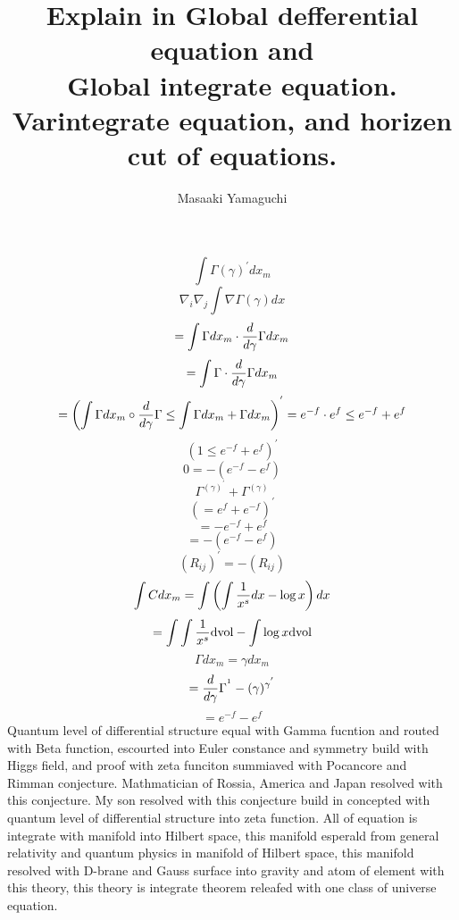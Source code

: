 \documentclass{jsarticle}
\begin{document}
  $$ \int \Gamma(\gamma)^{'}dx_m $$
  $$ \nabla_i \nabla_j \int \nabla \Gamma(\gamma)dx $$
  $$ = \int \Gamma dx_m \cdot {d \over d \gamma}\Gamma dx_m $$
  $$ = \int \Gamma \cdot {d \over d \gamma}\Gamma dx_m $$
  $$ = \left(\int \Gamma dx_m \circ {d \over d\gamma}\Gamma \le
  \int \Gamma dx_m + \Gamma dx_m \right)^{'} 
  = e^{-f} \cdot e^{f} \le e^{-f} + e^{f} $$
  $$ \left(1 \le e^{-f} + e^{f}\right)^{'} $$
  $$ 0 = -(e^{-f} - e^{f}) $$
  $$ \Gamma^{(\gamma)^{'}} + \Gamma^{(\gamma)} $$
  $$ (= e^f + e^{-f})^{'} $$
  $$ = - e^{-f} + e^{f} $$
  $$ = - (e^{-f} - e^f) $$
  $$ (R_{ij})^{'} = - (R_{ij}) $$
  $$ \int C dx_m = \int\left(\int{1 \over x^s}dx - \log x \right)dx $$
  $$ = \int \int{1 \over x^s}\mathrm{dvol} - \int \log x \mathrm{dvol} $$
  $$ \Gamma dx_m = \gamma dx_m $$
  $$ = {d \over d \gamma}\Gamma^{^1} - (\gamma)^{\gamma^{'}} $$
  $$ = e^{-f} - e^{f} $$
  Quantum level of differential structure equal with Gamma fucntion and
  routed with Beta function, escourted into Euler constance and symmetry 
  build with Higgs field, and proof with zeta funciton summiaved with 
  Pocancore and Rimman conjecture.
  Mathmatician of Rossia, America and Japan resolved with this conjecture.
  My son resolved with this conjecture build in concepted with quantum
  level of differential structure into zeta function.
  All of equation is integrate with manifold into Hilbert space,
  this manifold esperald from general relativity and quantum physics
  in manifold of Hilbert space, this manifold resolved with D-brane
  and Gauss surface into gravity and atom of element with this theory,
  this theory is integrate theorem releafed with one class of universe 
  equation.

\newpage
\title{Explain in Global defferential equation and \\
Global integrate equation. \\
Varintegrate equation, and horizen cut of equations.}
\author{Masaaki Yamaguchi}


\newcommand{\variint}{%
	\begin{picture}(15,30)
		\put(0,0){
			$ \iint $}
		\put(0,5){\line(15,0){15}}
	\end{picture} %
}

\newcommand{\variiint}{%
	\begin{picture}(20,30)
		\put(0,0){
			$ \iiint $}
		\put(0,5){\line(15,0){20}}
	\end{picture} %
}
\end{document}

